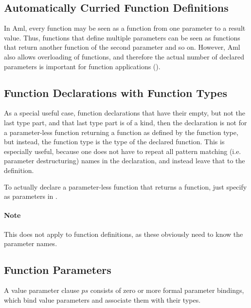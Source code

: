 \subsection{Automatically Curried Function Definitions}

In Aml, every function may be seen as a function from one parameter to a result value. Thus, functions that define multiple parameters can be seen as functions that return another function of the second parameter and so on. However, Aml also allows overloading of functions, and therefore the actual number of declared parameters is important for function applications ().





\subsection{Function Declarations with Function Types}

As a special useful case, function declarations that have their  empty, but not the last type part, and that last type part is of a  kind, then the declaration is not for a parameter-less function returning a function as defined by the function type, but instead, the function type is the type of the declared function. This is especially useful, because one does not have to repeat all pattern matching (i.e. parameter destructuring) names in the declaration, and instead leave that to the definition. 

To actually declare a parameter-less function that returns a function, just specify \code{()} as parameters in . 

\paragraph{Note}
This does not apply to function definitions, as these obviously need to know the parameter names. 





\subsection{Function Parameters}

A value parameter clause $ps$ consists of zero or more formal parameter bindings, which bind value parameters and associate them with their types. 

